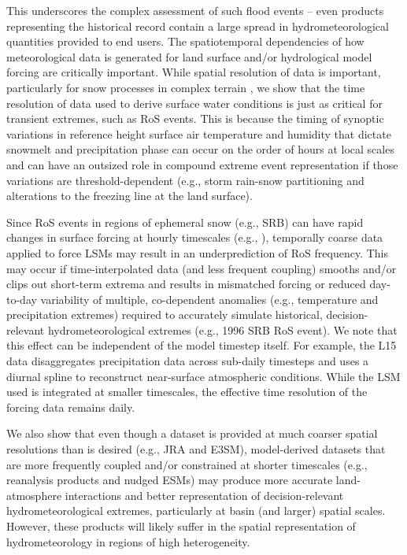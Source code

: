 \documentclass[nhess, manuscript]{copernicus}
\begin{document}

This underscores the complex assessment of such flood events -- even products representing the historical record contain a large spread in hydrometeorological quantities provided to end users. The spatiotemporal dependencies of how meteorological data is generated for land surface and/or hydrological model forcing are critically important.
While spatial resolution of data is important, particularly for snow processes in complex terrain \citep{henn2018an,Woodburn2021}, we show that the time resolution of data used to derive surface water conditions is just as critical for transient extremes, such as RoS events.
This is because the timing of synoptic variations in reference height surface air temperature and humidity that dictate snowmelt and precipitation phase can occur on the order of hours at local scales and can have an outsized role in compound extreme event representation if those variations are threshold-dependent (e.g., storm rain-snow partitioning and alterations to the freezing line at the land surface).

Since RoS events in regions of ephemeral snow (e.g., SRB) can have rapid changes in surface forcing at hourly timescales (e.g., \citet{leathers1998severe}), temporally coarse data applied to force LSMs may result in an underprediction of RoS frequency.
This may occur if time-interpolated data (and less frequent coupling) smooths and/or clips out short-term extrema and results in mismatched forcing or reduced day-to-day variability of multiple, co-dependent anomalies (e.g., temperature and precipitation extremes) required to accurately simulate historical, decision-relevant hydrometeorological extremes (e.g., 1996 SRB RoS event). We note that this effect can be independent of the model timestep itself. For example, the L15 data disaggregates precipitation data across sub-daily timesteps and uses a diurnal spline to reconstruct near-surface atmospheric conditions. While the LSM used is integrated at smaller timescales, the effective time resolution of the forcing data remains daily.

We also show that even though a dataset is provided at much coarser spatial resolutions than is desired (e.g., JRA and E3SM), model-derived datasets that are more frequently coupled and/or constrained at shorter timescales (e.g., reanalysis products and nudged ESMs) may produce more accurate land-atmosphere interactions and better representation of decision-relevant hydrometeorological extremes, particularly at basin (and larger) spatial scales. However, these products will likely suffer in the spatial representation of hydrometeorology in regions of high heterogeneity.
\end{document}

